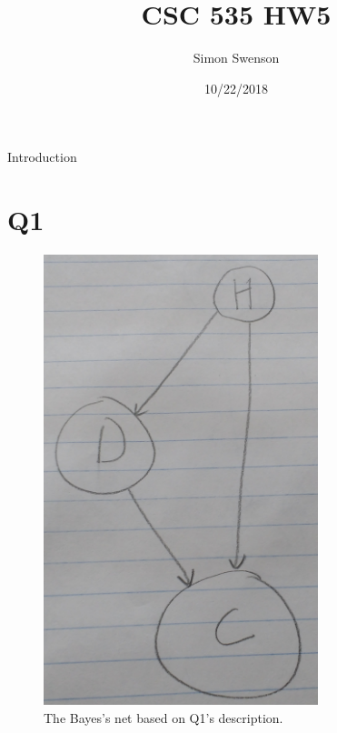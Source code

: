 \documentclass{article}
\title{CSC 535 HW5}
\date{10/22/2018}
\author{Simon Swenson}
\begin{document}
\maketitle
{}

\large Introduction

\small 

\section{Q1}

\begin{figure}[!ht]
	\centering
	\includegraphics[width=80mm]{figs/drug-bayess-net.jpg}
	\caption{The Bayes's net based on Q1's description.}
\end{figure}
\end{document}
